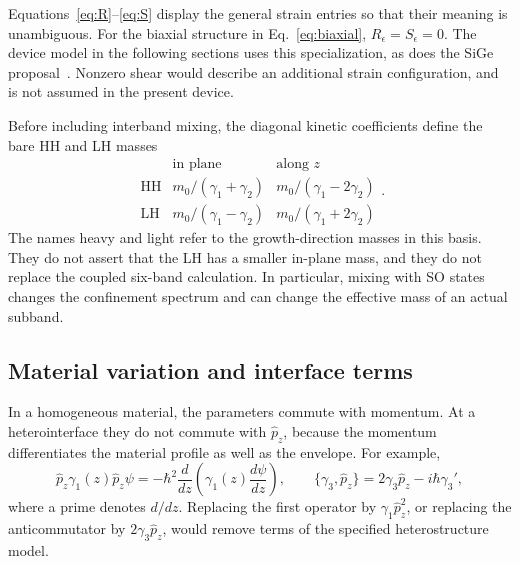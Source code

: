 \documentclass[10pt,letterpaper]{article}
\newcommand{\ep}{\epsilon}
\newcommand{\HH}{\mathrm{HH}}
\newcommand{\LH}{\mathrm{LH}}
\begin{document}
Equations~\eqref{eq:R}--\eqref{eq:S} display the general strain entries so that their meaning is unambiguous. For the biaxial structure in Eq.~\eqref{eq:biaxial}, $R_\ep=S_\ep=0$. The device model in the following sections uses this specialization, as does the SiGe proposal~\cite{valvo,delvecchio2026}. Nonzero shear would describe an additional strain configuration, and is not assumed in the present device.

Before including interband mixing, the diagonal kinetic coefficients define the bare HH and LH masses
\begin{equation}
\begin{array}{c|cc}
&\text{in plane}&\text{along }z\\[2pt]\hline
\HH&m_0/(\gamma_1+\gamma_2)&m_0/(\gamma_1-2\gamma_2)\\[2pt]
\LH&m_0/(\gamma_1-\gamma_2)&m_0/(\gamma_1+2\gamma_2)
\end{array}.
\label{eq:masses}
\end{equation}
The names heavy and light refer to the growth-direction masses in this basis. They do not assert that the LH has a smaller in-plane mass, and they do not replace the coupled six-band calculation. In particular, mixing with SO states changes the confinement spectrum and can change the effective mass of an actual subband.

\subsection{Material variation and interface terms}

In a homogeneous material, the parameters commute with momentum. At a heterointerface they do not commute with $ \hat{p}_ z$, because the momentum differentiates the material profile as well as the envelope. For example,
\begin{equation}
 \hat{p}_ z\gamma_1(z) \hat{p}_ z\psi
=-\hbar^2\frac{d}{dz}\left(\gamma_1(z)\frac{d\psi}{dz}\right),
\qquad
\{\gamma_3, \hat{p}_ z\}=2\gamma_3 \hat{p}_ z-i\hbar\gamma_3',
\label{eq:ordering}
\end{equation}
where a prime denotes $d/dz$. Replacing the first operator by $\gamma_1 \hat{p}_ z^2$, or replacing the anticommutator by $2\gamma_3 \hat{p}_ z$, would remove terms of the specified heterostructure model.
\end{document}
